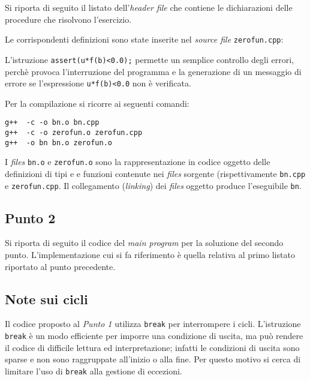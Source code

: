 Si riporta di seguito il listato dell'\emph{header file} che contiene
le dichiarazioni delle procedure che risolvono l'esercizio.
\lstset{basicstyle=\scriptsize\sf}

\lstset{basicstyle=\sf}

Le corrispondenti definizioni sono state inserite nel \emph{source file}
\texttt{zerofun.cpp}:
\lstset{basicstyle=\scriptsize\sf}

\lstset{basicstyle=\sf}

L'istruzione \texttt{assert(u*f(b)<0.0);} permette un semplice controllo degli errori,
 perch\`e provoca l'interruzione del programma e la generazione di un
 messaggio di errore se l'espressione \texttt{u*f(b)<0.0} non \`e verificata.

Per la compilazione si ricorre ai seguenti comandi:
\begin{verbatim}
g++  -c -o bn.o bn.cpp
g++  -c -o zerofun.o zerofun.cpp
g++  -o bn bn.o zerofun.o
\end{verbatim} 

I \emph{files} \texttt{bn.o} e \texttt{zerofun.o} sono la
rappresentazione in codice oggetto delle
definizioni di tipi e e funzioni contenute nei \emph{files} sorgente
(rispettivamente \texttt{bn.cpp} e \texttt{zerofun.cpp}. Il
collegamento (\emph{linking}) dei \emph{files} oggetto produce l'eseguibile
\texttt{bn}.

\subsection*{Punto 2}
Si riporta di seguito il codice del \emph{main program} per la
soluzione del secondo punto. L'implementazione cui si fa riferimento
\`e quella relativa al primo listato riportato al punto precedente.
\lstset{basicstyle=\scriptsize\sf}

\lstset{basicstyle=\sf}

\subsection*{Note sui cicli}
Il codice proposto al \emph{Punto 1} utilizza \texttt{break} per interrompere
i cicli. L'istruzione \texttt{break} \`e un modo efficiente per
imporre una condizione di uscita, ma pu\`o rendere il codice di difficile
lettura ed interpretazione; infatti le condizioni di uscita sono sparse e non
sono raggruppate all'inizio o alla fine. Per questo motivo si cerca di limitare
l'uso di \texttt{break} alla gestione di eccezioni.

